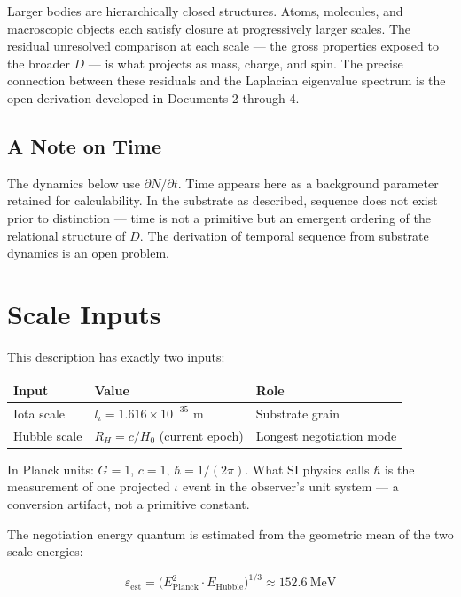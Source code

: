 \documentclass[11pt,letterpaper]{article}
\begin{document}
Larger bodies are hierarchically closed structures. Atoms, molecules, and macroscopic objects each satisfy closure at progressively larger scales. The residual unresolved comparison at each scale --- the gross properties exposed to the broader \(D\) --- is what projects as mass, charge, and spin. The precise connection between these residuals and the Laplacian eigenvalue spectrum is the open derivation developed in Documents 2 through 4.

\subsection{A Note on Time}
\label{sec:org519d445}

The dynamics below use \(\partial N / \partial t\). Time appears here as a background parameter retained for calculability. In the substrate as described, sequence does not exist prior to distinction --- time is not a primitive but an emergent ordering of the relational structure of \(D\). The derivation of temporal sequence from substrate dynamics is an open problem.

\section{Scale Inputs}
\label{sec:org7970218}

This description has exactly two inputs:

\begin{center}
\begin{tabular}{lll}
\toprule
\textbf{Input} & \textbf{Value} & \textbf{Role}\\[0pt]
\midrule
Iota scale & \(l_\iota = 1.616 \times 10^{-35}\) m & Substrate grain\\[0pt]
Hubble scale & \(R_H = c/H_0\) (current epoch) & Longest negotiation mode\\[0pt]
\bottomrule
\end{tabular}
\end{center}

In Planck units: \(G = 1\), \(c = 1\), \(\hbar = 1/(2\pi)\). What SI physics calls \(\hbar\) is the measurement of one projected \(\iota\) event in the observer's unit system --- a conversion artifact, not a primitive constant.

The negotiation energy quantum is estimated from the geometric mean of the two scale energies:

\begin{equation}
\varepsilon_\text{est} = \bigl(E_\text{Planck}^2 \cdot E_\text{Hubble}\bigr)^{1/3} \approx 152.6\ \text{MeV}
\end{equation}
\end{document}
